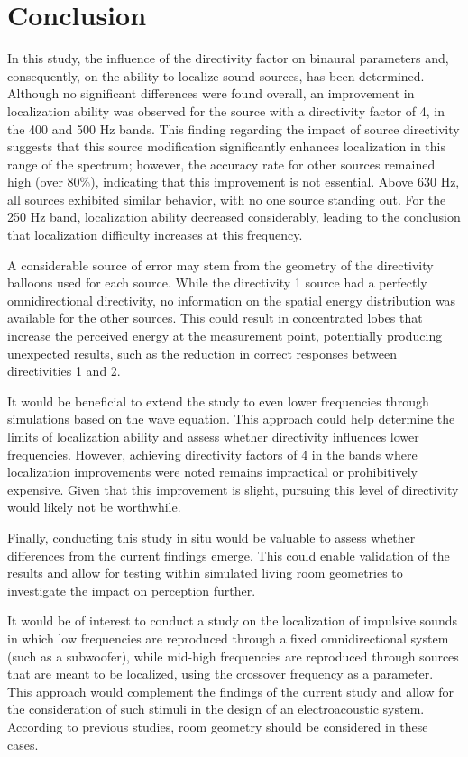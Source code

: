 \section{\large\textbf{Conclusion}}
In this study, the influence of the directivity factor on binaural parameters and, consequently, on the ability to localize sound sources, has been determined. Although no significant differences were found overall, an improvement in localization ability was observed for the source with a directivity factor of 4, in the 400 and 500 Hz bands. This finding regarding the impact of source directivity suggests that this source modification significantly enhances localization in this range of the spectrum; however, the accuracy rate for other sources remained high (over 80\%), indicating that this improvement is not essential. Above 630 Hz, all sources exhibited similar behavior, with no one source standing out. For the 250 Hz band, localization ability decreased considerably, leading to the conclusion that localization difficulty increases at this frequency.

A considerable source of error may stem from the geometry of the directivity balloons used for each source. While the directivity 1 source had a perfectly omnidirectional directivity, no information on the spatial energy distribution was available for the other sources. This could result in concentrated lobes that increase the perceived energy at the measurement point, potentially producing unexpected results, such as the reduction in correct responses between directivities 1 and 2.

It would be beneficial to extend the study to even lower frequencies through simulations based on the wave equation. This approach could help determine the limits of localization ability and assess whether directivity influences lower frequencies. However, achieving directivity factors of 4 in the bands where localization improvements were noted remains impractical or prohibitively expensive. Given that this improvement is slight, pursuing this level of directivity would likely not be worthwhile.

Finally, conducting this study in situ would be valuable to assess whether differences from the current findings emerge. This could enable validation of the results and allow for testing within simulated living room geometries to investigate the impact on perception further.

It would be of interest to conduct a study on the localization of impulsive sounds in which low frequencies are reproduced through a fixed omnidirectional system (such as a subwoofer), while mid-high frequencies are reproduced through sources that are meant to be localized, using the crossover frequency as a parameter. This approach would complement the findings of the current study and allow for the consideration of such stimuli in the design of an electroacoustic system. According to previous studies, room geometry should be considered in these cases.
